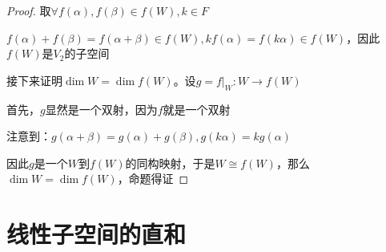 \documentclass[12pt, a4paper, oneside, UTF8]{ctexbook}
\begin{document}
\begin{para}{0}
\begin{proof}
						取$\forall f(\alpha ),f(\beta )\in f(W),k \in F$

						$f(\alpha )+f(\beta )=f(\alpha +\beta ) \in f(W),kf(\alpha )=f(k\alpha )\in f(W)$，因此$f(W)$是$V_2$的子空间

						接下来证明$\dim W = \dim f(W)$。设$g=f|_W : W \to f(W)$

						首先，$g$显然是一个双射，因为$f$就是一个双射

						注意到：$g(\alpha +\beta )=g(\alpha )+g(\beta ),g(k\alpha )=kg(\alpha )$

						因此$g$是一个$W$到$f(W)$的同构映射，于是$W \cong f(W)$，那么$\dim W=\dim f(W)$，命题得证
					\end{proof}
			\end{para}
	\section{线性子空间的直和}
\end{document}
